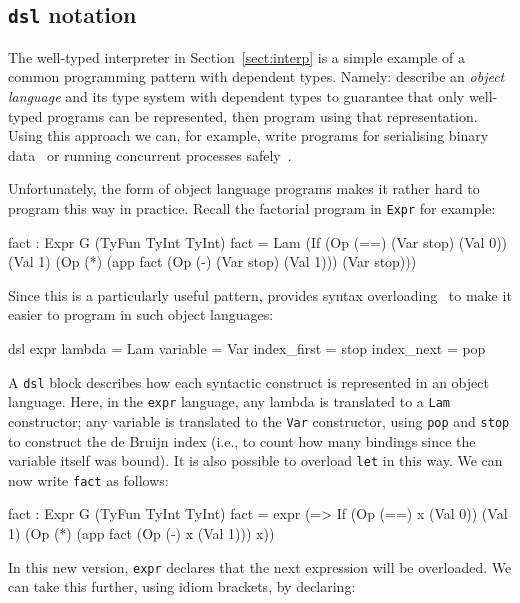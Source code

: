 \subsection{\texttt{dsl} notation}

The well-typed interpreter in Section~\ref{sect:interp} is a simple example of a common programming pattern with dependent types.
Namely: describe an \emph{object language} and its type system with dependent types to guarantee that only well-typed programs can be represented, then program using that representation.
Using this approach we can, for example, write programs for serialising binary data~\cite{plpv11} or running concurrent processes safely~\cite{cbconc-fi}.

Unfortunately, the form of object language programs makes it rather hard to program this way in practice.
Recall the factorial program in \texttt{Expr} for example:

\begin{code}
fact : Expr G (TyFun TyInt TyInt)
fact = Lam (If (Op (==) (Var stop) (Val 0))
               (Val 1) (Op (*) (app fact (Op (-) (Var stop) (Val 1))) 
                               (Var stop)))
\end{code}

\noindent
Since this is a particularly useful pattern, \Idris{} provides syntax overloading~\cite{res-dsl-padl12} to make it easier to program in such object languages:

\begin{code}
dsl expr
    lambda      = Lam
    variable    = Var
    index_first = stop
    index_next  = pop
\end{code} 

\noindent
A \texttt{dsl} block describes how each syntactic construct is represented in an object language.
Here, in the \texttt{expr} language, any \Idris{} lambda is translated to a \texttt{Lam} constructor; any variable is translated to the \texttt{Var} constructor, using \texttt{pop} and \texttt{stop} to construct the de Bruijn index (i.e., to count how many bindings since the variable itself was bound).
It is also possible to overload \texttt{let} in this way. We can now write \texttt{fact} as follows:

\begin{code}
fact : Expr G (TyFun TyInt TyInt)
fact = expr (\x => If (Op (==) x (Val 0))
                      (Val 1) (Op (*) (app fact (Op (-) x (Val 1))) x))
\end{code} 

\noindent
In this new version, \texttt{expr} declares that the next expression will be overloaded.
We can take this further, using idiom brackets, by declaring:

